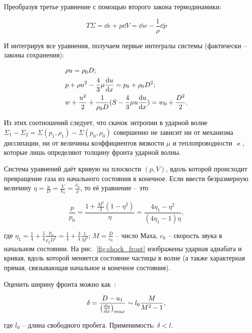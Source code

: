 \documentclass[10pt, a4paper]{article}
\begin{document}
Преобразуя третье уравнение с помощью второго закона термодинамики: 

\begin{equation*}
	T \Sigma = \dd{\epsilon}+p\dd{V} = \dd{w}-\frac{1}{\rho} \dd{p} 
\end{equation*}

И интегрируя все уравнения, получаем первые интегралы системы (фактически -- законы сохранения):

\begin{align*}
	&\rho u = \rho_0 D; \\ 
	& p+\rho u^{2} - \frac{4}{3} \mu \dv{u}{x} = p_0 + \rho_0 D^{2}; \\
	& w + \frac{u^{2}}{2} + \frac{1}{\rho_0 D} (S - \frac{4}{3} \mu u \dv{u}{x}) = w_0 + \frac{D^{2}}{2}.
\end{align*}

Из этих соотношений следует, что скачок энтропии в ударной волне $\Sigma_1-\Sigma_2 = \Sigma(p_1, \rho_1)-\Sigma(p_0, \rho_0)$ совершенно не зависит ни от механизма диссипации, ни от величины коэффициентов вязкости $\mu$ и теплопроводности $\varkappa$, которые лишь определяют толщину фронта ударной волны.

Система уравнений даёт кривую на плоскости $(p, V)$, вдоль которой происходит превращение газа из начального состояния в конечное. Если ввести безразмерную величину $\eta = \frac{u}{D} = \frac{V}{V_0} = \frac{\rho_0}{\rho}$, то её уравнение -- это

\begin{equation*}
	\frac{p}{p_0}=\frac{1 + \frac{M^{2}}{3} (1-\eta^{2})}{\eta}=\frac{4 \eta_1 - \eta^{2}}{(4 \eta_1 -1) \eta},
\end{equation*}

где $\eta_1 = \frac{1}{4}+\frac{5}{4} \frac{p_0}{\rho_0 D^{2}}= \frac{1}{4} + \frac{3}{4} \frac{1}{M^{2}}$; $M=\frac{D}{c_0}$ -- число Маха, $c_0$ -- скорость звука в начальном состоянии. На рис.~\ref{fig:shock_front} изображены ударная адиабата и кривая, вдоль которой
меняется состояние частицы в волне (а также характерная прямая, связывающая начальное и конечное состояния).

Оценить ширину фронта можно как~\cite{zeldovich}:

\begin{equation*}
	\delta = \frac{D-u_1}{\left(\dv{u}{x}\right)_{max}} \sim l_0 \frac{M}{M^{2}-1},
\end{equation*}

где $l_0$ -- длина свободного пробега. Применимость: $\delta<l$.
\end{document}
